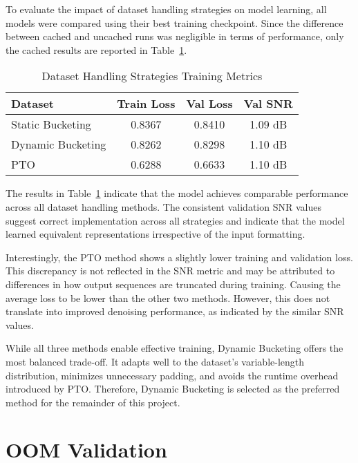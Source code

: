 To evaluate the impact of dataset handling strategies on model learning, all models were compared using their best training checkpoint. Since the difference between cached and uncached runs was negligible in terms of performance, only the cached results are reported in Table~\ref{tab:dataset_performance}.

\vspace{1em}
\begin{table}[H]
\centering
\caption{Dataset Handling Strategies Training Metrics}
\label{tab:dataset_performance}
\begin{tabular}{|l|c|c|c|}
\hline
\textbf{Dataset} & \textbf{Train Loss} & \textbf{Val Loss} & \textbf{Val SNR} \\
\hline
Static Bucketing  & 0.8367  & 0.8410  & 1.09 dB \\
Dynamic Bucketing & 0.8262  & 0.8298  & 1.10 dB \\  
PTO               & 0.6288  & 0.6633  & 1.10 dB \\
\hline
\end{tabular}
\end{table}

The results in Table~\ref{tab:dataset_performance} indicate that the model achieves comparable performance across all dataset handling methods. The consistent validation SNR values suggest correct implementation across all strategies and indicate that the model learned equivalent representations irrespective of the input formatting.

Interestingly, the PTO method shows a slightly lower training and validation loss. This discrepancy is not reflected in the SNR metric and may be attributed to differences in how output sequences are truncated during training. Causing the average loss to be lower than the other two methods. However, this does not translate into improved denoising performance, as indicated by the similar SNR values.

While all three methods enable effective training, Dynamic Bucketing offers the most balanced trade-off. It adapts well to the dataset’s variable-length distribution, minimizes unnecessary padding, and avoids the runtime overhead introduced by PTO. Therefore, Dynamic Bucketing is selected as the preferred method for the remainder of this project.

\section{OOM Validation}
\label{sec:oom_validation}

